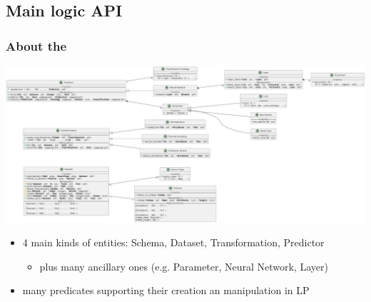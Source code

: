\documentclass[presentation]{beamer}\mode<presentation>{\usetheme{AMSBolognaFC}}
\begin{document}
\subsection{Main logic API}

\begin{frame}%
    \frametitle{About the \mllib{}}

    \includegraphics[width=\linewidth]{figures/entities.pdf}
    \begin{itemize}
        \item 4 main kinds of entities: Schema, Dataset, Transformation, Predictor
        \begin{itemize}
            \item plus many ancillary ones (e.g. Parameter, Neural Network, Layer)
        \end{itemize}
        \item many predicates supporting their creation an manipulation in LP
    \end{itemize}

\end{frame}
\end{document}

